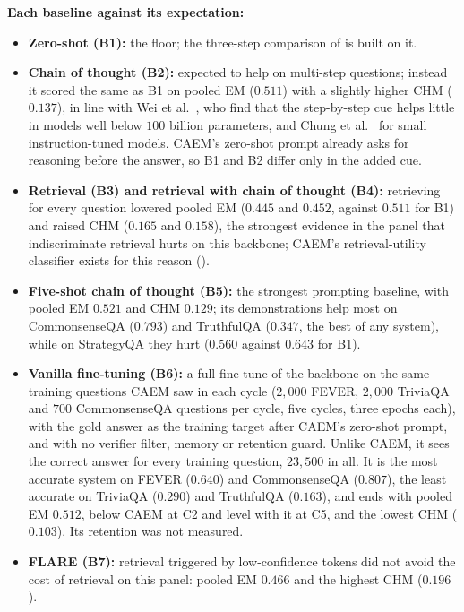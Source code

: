 \textbf{Each baseline against its expectation:}
\begin{itemize}
    \item \textbf{Zero-shot (B1):}\label{sec:comp-zero-shot} the floor; the three-step comparison of  is built on it.
    \item \textbf{Chain of thought (B2):}\label{sec:comp-cot} expected to help on multi-step questions; instead it scored the same as B1 on pooled EM ($0.511$) with a slightly higher CHM ($0.137$), in line with Wei et al.~\cite{wei2022chain}, who find that the step-by-step cue helps little in models well below $100$ billion parameters, and Chung et al.~\cite{JMLR:v25:23-0870} for small instruction-tuned models. CAEM's zero-shot prompt already asks for reasoning before the answer, so B1 and B2 differ only in the added cue.
    \item \textbf{Retrieval (B3) and retrieval with chain of thought (B4):}\label{sec:comp-rag}\label{sec:comp-cot-rag} retrieving for every question lowered pooled EM ($0.445$ and $0.452$, against $0.511$ for B1) and raised CHM ($0.165$ and $0.158$), the strongest evidence in the panel that indiscriminate retrieval hurts on this backbone; CAEM's retrieval-utility classifier exists for this reason ().
    \item \textbf{Five-shot chain of thought (B5):}\label{sec:comp-fewshot} the strongest prompting baseline, with pooled EM $0.521$ and CHM $0.129$; its demonstrations help most on CommonsenseQA ($0.793$) and TruthfulQA ($0.347$, the best of any system), while on StrategyQA they hurt ($0.560$ against $0.643$ for B1).
    \item \textbf{Vanilla fine-tuning (B6):}\label{sec:comp-vanilla-ft} a full fine-tune of the backbone on the same training questions CAEM saw in each cycle ($2{,}000$ FEVER, $2{,}000$ TriviaQA and $700$ CommonsenseQA questions per cycle, five cycles, three epochs each), with the gold answer as the training target after CAEM's zero-shot prompt, and with no verifier filter, memory or retention guard. Unlike CAEM, it sees the correct answer for every training question, $23{,}500$ in all. It is the most accurate system on FEVER ($0.640$) and CommonsenseQA ($0.807$), the least accurate on TriviaQA ($0.290$) and TruthfulQA ($0.163$), and ends with pooled EM $0.512$, below CAEM at C2 and level with it at C5, and the lowest CHM ($0.103$). Its retention was not measured.
    \item \textbf{FLARE (B7):}\label{sec:comp-flare} retrieval triggered by low-confidence tokens did not avoid the cost of retrieval on this panel: pooled EM $0.466$ and the highest CHM ($0.196$).

\end{itemize}
